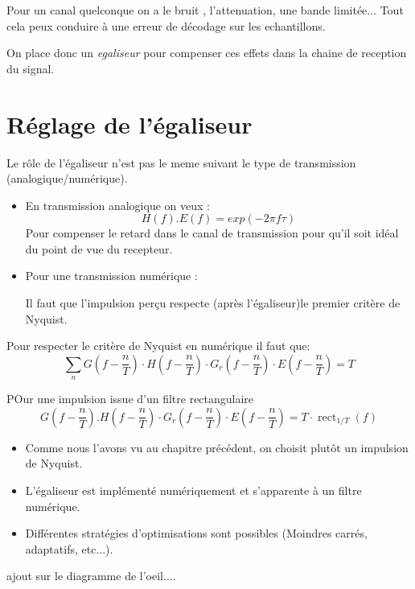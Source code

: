 \documentclass[main.tex]{subfiles}
\begin{document}
\begin{rem}
  Pour un canal quelconque on a le bruit , l'attenuation, une bande limitée... Tout cela peux conduire à une erreur de décodage sur les echantillons.

  On place donc un \emph{egaliseur} pour compenser ces effets dans la chaine de reception du signal.
\end{rem}
\section{Réglage de l'égaliseur}
\begin{rem}
  Le rôle de l'égaliseur n'est pas le meme suivant le type de transmission (analogique/numérique).
  \begin{itemize}
  \item En transmission analogique on veux :
    \[
      H(f).E(f) = exp(-2\pi f\tau)
    \]
    Pour compenser le retard dans le canal de transmission pour qu'il soit idéal du point de vue du recepteur.
  \item Pour une transmission numérique :

    Il faut que l'impulsion perçu respecte (après l'égaliseur)le premier critère de Nyquist.
  \end{itemize}
\end{rem}

\begin{prop}
Pour respecter le critère de Nyquist en numérique il faut que:
  \[
\sum_{n} G\left(f-\frac{n}{T}\right) \cdot H\left(f-\frac{n}{T}\right) \cdot G_{r}\left(f-\frac{n}{T}\right) \cdot E\left(f-\frac{n}{T}\right)=T
\]
\end{prop}

\begin{rem}
  POur une impulsion issue d'un filtre rectangulaire
  \[
G\left(f-\frac{n}{T}\right) . H\left(f-\frac{n}{T}\right) \cdot G_{r}\left(f-\frac{n}{T}\right) \cdot E\left(f-\frac{n}{T}\right)=T \cdot \operatorname{rect}_{1 / T}(f)
\]
\end{rem}

\begin{rem}
  \begin{itemize}
  \item Comme nous l’avons vu au chapitre précédent, on choisit plutôt
    un impulsion de Nyquist.
  \item   L’égaliseur est implémenté numériquement
    et s’apparente à un filtre numérique.
  \item   Différentes stratégies
    d’optimisations sont possibles (Moindres carrés, adaptatifs,
    etc...).
\end{itemize}
\end{rem}

ajout sur le diagramme de l'oeil....
\end{document}
